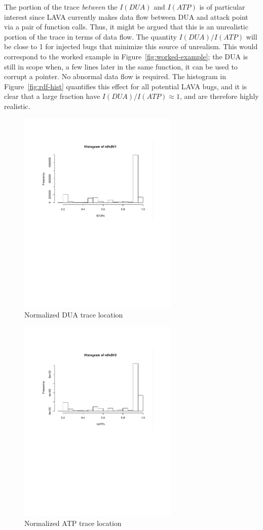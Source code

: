 The portion of the trace \emph{between} the $I(DUA)$ and $I(ATP)$ is of particular interest since LAVA currently makes data flow between DUA and attack point via a pair of function calls.
Thus, it might be argued that this is an unrealistic portion of the trace in terms of data flow.
The quantity $I(DUA)/I(ATP)$ will be close to 1 for injected bugs that minimize this source of unrealism.
This would correspond to the worked example in Figure~\ref{fig:worked-example}; the DUA is still in scope when, a few lines later in the same function, it can be used to corrupt a pointer.
No abnormal data flow is required.
The histogram in Figure~\ref{fig:rdf-hist} quantifies this effect for all potential LAVA bugs, and it is clear that a large fraction have $I(DUA)/I(ATP) \approx 1$, and are therefore highly realistic.

\begin{figure}
\centering
\includegraphics[width=3in]{dua.pdf}
\caption{Normalized DUA trace location}
\label{fig:dua-hist}
\end{figure}

\begin{figure}
\centering
\includegraphics[width=3in]{atp.pdf}
\caption{Normalized ATP trace location}
\label{fig:atp-hist}
\end{figure}


